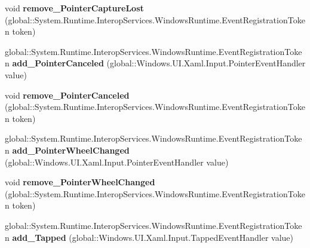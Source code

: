 \begin{DoxyCompactItemize}
\mbox{\label{interface_windows_1_1_u_i_1_1_xaml_1_1_i_u_i_element_a0e8fccaf0e69daa6bc50f43458fa846a}} 
void {\bfseries remove\+\_\+\+Pointer\+Capture\+Lost} (global\+::\+System.\+Runtime.\+Interop\+Services.\+Windows\+Runtime.\+Event\+Registration\+Token token)
\item 
\mbox{\label{interface_windows_1_1_u_i_1_1_xaml_1_1_i_u_i_element_aece41d38eee31db31fcc9ce4940bc61d}} 
global\+::\+System.\+Runtime.\+Interop\+Services.\+Windows\+Runtime.\+Event\+Registration\+Token {\bfseries add\+\_\+\+Pointer\+Canceled} (global\+::\+Windows.\+U\+I.\+Xaml.\+Input.\+Pointer\+Event\+Handler value)
\item 
\mbox{\label{interface_windows_1_1_u_i_1_1_xaml_1_1_i_u_i_element_ac9b592ea4f90c7a92f1def7811d1d96f}} 
void {\bfseries remove\+\_\+\+Pointer\+Canceled} (global\+::\+System.\+Runtime.\+Interop\+Services.\+Windows\+Runtime.\+Event\+Registration\+Token token)
\item 
\mbox{\label{interface_windows_1_1_u_i_1_1_xaml_1_1_i_u_i_element_a2716b15da4333bb063c9bc09c373340f}} 
global\+::\+System.\+Runtime.\+Interop\+Services.\+Windows\+Runtime.\+Event\+Registration\+Token {\bfseries add\+\_\+\+Pointer\+Wheel\+Changed} (global\+::\+Windows.\+U\+I.\+Xaml.\+Input.\+Pointer\+Event\+Handler value)
\item 
\mbox{\label{interface_windows_1_1_u_i_1_1_xaml_1_1_i_u_i_element_abfc60dbc7d299bf2692903f393ed810f}} 
void {\bfseries remove\+\_\+\+Pointer\+Wheel\+Changed} (global\+::\+System.\+Runtime.\+Interop\+Services.\+Windows\+Runtime.\+Event\+Registration\+Token token)
\item 
\mbox{\label{interface_windows_1_1_u_i_1_1_xaml_1_1_i_u_i_element_a991022bdcf7af68dd9c2bf3964b3bb14}} 
global\+::\+System.\+Runtime.\+Interop\+Services.\+Windows\+Runtime.\+Event\+Registration\+Token {\bfseries add\+\_\+\+Tapped} (global\+::\+Windows.\+U\+I.\+Xaml.\+Input.\+Tapped\+Event\+Handler value)
\item 

\end{DoxyCompactItemize}
